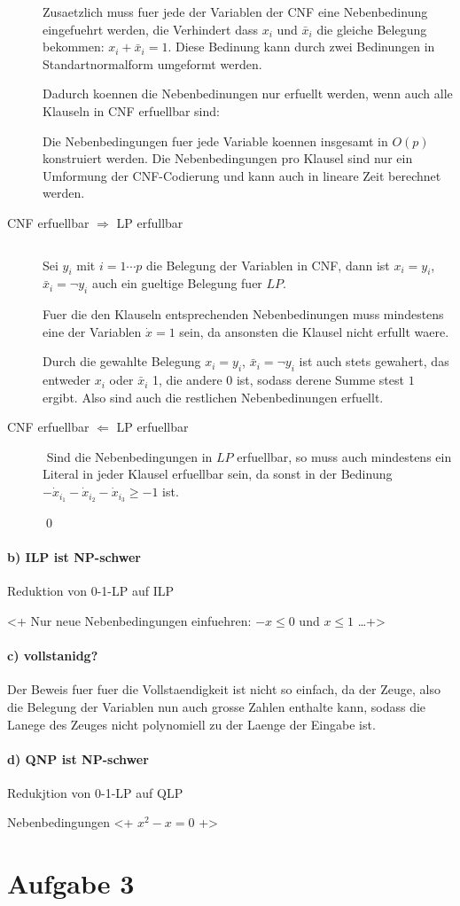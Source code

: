 \begin{description}
Zusaetzlich muss fuer jede der Variablen der CNF eine Nebenbedinung eingefuehrt werden,
die Verhindert dass $x_i$ und $\bar x_i$ die gleiche Belegung bekommen:
$x_i + \bar x_i = 1$. Diese Bedinung kann durch zwei Bedinungen in Standartnormalform umgeformt werden.

Dadurch koennen die Nebenbedinungen nur erfuellt werden, wenn auch alle Klauseln in CNF erfuellbar sind:

Die Nebenbedingungen fuer jede Variable koennen insgesamt in $O(p)$ konstruiert werden.
Die Nebenbedingungen pro Klausel sind nur ein Umformung der CNF-Codierung und kann
auch in lineare Zeit berechnet werden.

\item[CNF erfuellbar $\Rightarrow$ LP erfullbar] $ $

Sei $y_i$ mit $i=1 \cdots p$ die Belegung der Variablen in CNF,
dann ist $x_i = y_i$, $\bar x_i = \lnot y_i$ auch ein gueltige Belegung fuer $LP$.

Fuer die den Klauseln entsprechenden Nebenbedinungen muss mindestens eine
der Variablen $\dot x = 1$ sein, da ansonsten die Klausel nicht erfullt waere.

Durch die gewahlte Belegung  $x_i = y_i$, $\bar x_i = \lnot y_i$ ist auch stets gewahert,
das entweder $x_i$ oder $\bar x_i$ 1, die andere 0 ist, sodass derene Summe stest $1$ ergibt.
Also sind auch die restlichen Nebenbedinungen erfuellt.

\item[CNF erfuellbar $\Leftarrow$ LP erfuellbar] $ $
Sind die Nebenbedingungen in $LP$ erfuellbar, so muss auch mindestens ein Literal in jeder 
Klausel erfuellbar sein, da sonst in der Bedinung $-\dot x_{i_1} - \dot x_{i_2} - \dot x_{i_3}\geq -1$
ist.

\qed

\end{description}





\paragraph{b) ILP ist NP-schwer} Reduktion von 0-1-LP auf ILP

<+ Nur neue Nebenbedingungen einfuehren: $-x \leq 0$ und $x \leq 1$ \ldots +>

\paragraph{c) vollstanidg?} 
Der Beweis fuer fuer die Vollstaendigkeit ist nicht so einfach, 
da der Zeuge, also die Belegung der Variablen nun auch grosse Zahlen enthalte
kann, sodass die Lanege des Zeuges nicht polynomiell zu der Laenge der 
Eingabe ist.

\paragraph{d) QNP ist NP-schwer} Redukjtion von 0-1-LP auf QLP

Nebenbedingungen <+ $x^2 - x = 0$ +>

\section*{Aufgabe 3}



